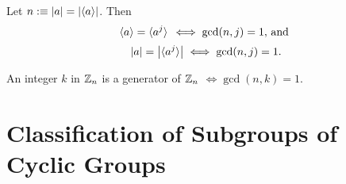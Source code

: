 \begin{corollary}
  Let $n:\equiv \abs{a}=\abs{\langle a \rangle}$. Then
  \begin{equation}
    \la a \ra = \la a^j \ra \, \iff \gcd (n,j) = 1, $ and $
  \end{equation}
  \begin{equation}
    \abs{a} = \abs{\langle a^j \rangle} \iff \gcd (n,j) = 1.
  \end{equation}
\end{corollary}

\begin{corollary}
  An integer $k$ in $\mathbb{Z}_n$ is a generator of $\mathbb{Z}_n$ $\iff \gcd(n,k) = 1$.
\end{corollary}

\section{Classification of Subgroups of Cyclic Groups}

